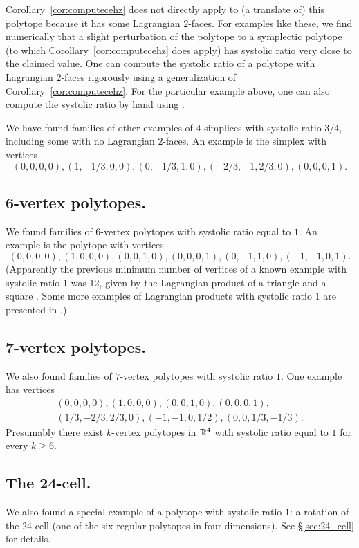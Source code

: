 \begin{remark}
Corollary~\ref{cor:computecehz} does not directly apply to (a translate of) this polytope because it has some Lagrangian $2$-faces. For examples like these, we find numerically that a slight perturbation of the polytope to a symplectic polytope (to which Corollary~\ref{cor:computecehz} does apply) has systolic ratio very close to the claimed value. One can compute the systolic ratio of a polytope with Lagrangian $2$-faces rigorously using a generalization of Corollary~\ref{cor:computecehz}. For the particular example above, one can also compute the systolic ratio by hand using \cite[Thm.\ 1.1]{haim-kislev}.
\end{remark}

We have found families of other examples of 4-simplices with systolic ratio $3/4$, including some with no Lagrangian $2$-faces. An example is the simplex with vertices
\[
(0,0,0,0), (1,-1/3,0,0), (0,-1/3,1,0), (-2/3,-1,2/3,0), (0,0,0,1).
\]

\subsection*{6-vertex polytopes.} We found families of 6-vertex polytopes with systolic ratio equal to $1$. An example is the polytope with vertices
\[
(0,0,0,0), (1,0,0,0), (0,0,1,0), (0,0,0,1), (0,-1,1,0), (-1,-1,0,1).
\]
(Apparently the previous minimum number of vertices of a known example with systolic ratio $1$ was 12, given by the Lagrangian product of a triangle and a square \cite[Lem.\ 5.3.1]{schlenk}. Some more examples of Lagrangian products with systolic ratio 1 are presented in \cite{balitskiy}.)

\subsection*{7-vertex polytopes.} We also found families of $7$-vertex polytopes with systolic ratio $1$. One example has vertices
\begin{gather*}
(0,0,0,0), (1,0,0,0), (0,0,1,0), (0,0,0,1),\\
 (1/3,-2/3,2/3,0), (-1,-1,0,1/2), (0,0,1/3,-1/3).
\end{gather*}
Presumably there exist $k$-vertex polytopes in ${\mathbb R}^4$ with systolic ratio equal to $1$ for every $k\ge 6$.

\subsection*{The 24-cell.} We also found a special example of a polytope with systolic ratio $1$: a rotation of the 24-cell (one of the six regular polytopes in four dimensions). See \S\ref{sec:24_cell} for details.

